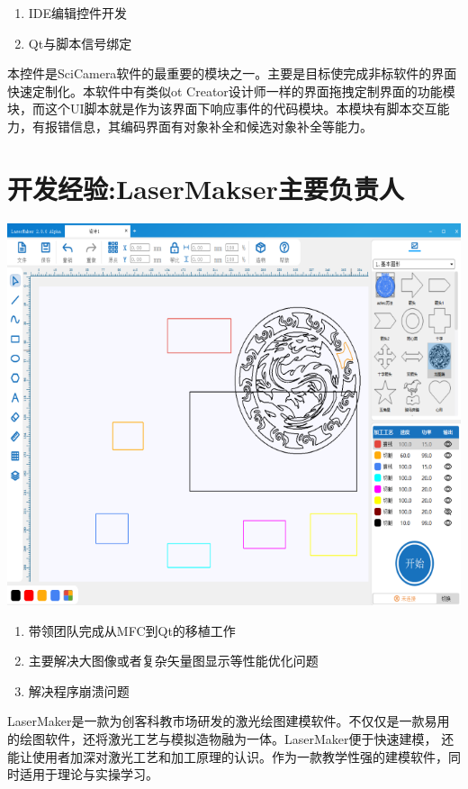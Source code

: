 \documentclass[lighthipster]{simplehipstercv}
\begin{document}
\begin{minipage}[t]{\textwidth}
\begin{minipage}[t]{0.5\textwidth}
\begin{flushleft}
			\begin{enumerate}
				\item IDE编辑控件开发
				\item Qt与脚本信号绑定
			\end{enumerate}
			本控件是SciCamera软件的最重要的模块之一。主要是目标使完成非标软件的界面快速定制化。本软件中有类似ot Creator设计师一样的界面拖拽定制界面的功能模块，而这个UI脚本就是作为该界面下响应事件的代码模块。本模块有脚本交互能力，有报错信息，其编码界面有对象补全和候选对象补全等能力。
		\end{flushleft}
		\end{minipage}
		\bigskip
	\end{minipage}
	\vspace{1em}
	
	\begin{minipage}[t]{\textwidth}
		\section*{开发经验:LaserMakser主要负责人}
		\begin{minipage}[thbp]{0.3\textwidth}
			\includegraphics[width=\linewidth]{PrjTL_1.png}
		\end{minipage} \hfill
		\begin{minipage}[thbp!]{0.6\textwidth}
			\begin{enumerate}
				\item 带领团队完成从MFC到Qt的移植工作
				\item 主要解决大图像或者复杂矢量图显示等性能优化问题
				\item 解决程序崩溃问题
			\end{enumerate}
			LaserMaker是一款为创客科教市场研发的激光绘图建模软件。不仅仅是一款易用的绘图软件，还将激光工艺与模拟造物融为一体。LaserMaker便于快速建模，
			还能让使用者加深对激光工艺和加工原理的认识。作为一款教学性强的建模软件，同时适用于理论与实操学习。
		\end{minipage}
		\bigskip
	\end{minipage}
	
\end{document}
